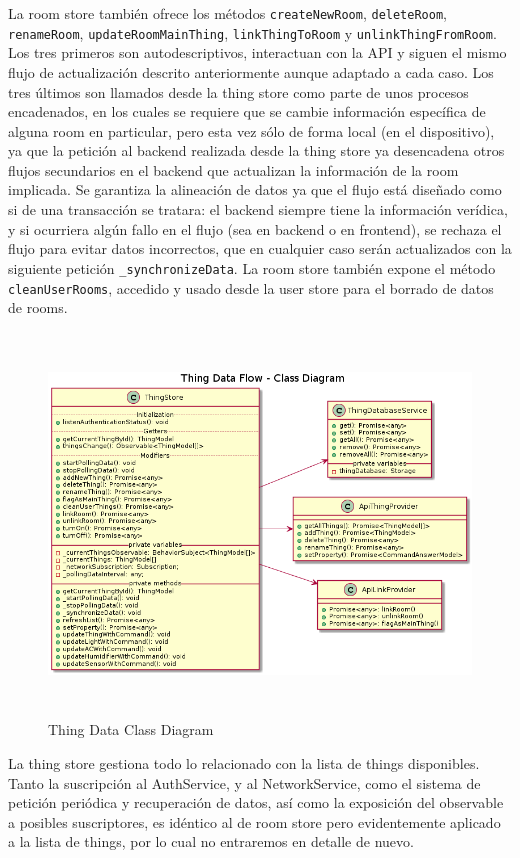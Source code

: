 La room store también ofrece los métodos \verb|createNewRoom|, \verb|deleteRoom|, \verb|renameRoom|, \verb|updateRoomMainThing|, \verb|linkThingToRoom| y \verb|unlinkThingFromRoom|. Los tres primeros son autodescriptivos, interactuan con la API y siguen el mismo flujo de actualización descrito anteriormente aunque adaptado a cada caso. Los tres últimos son llamados desde la thing store como parte de unos procesos encadenados, en los cuales se requiere que se cambie información específica de alguna room en particular, pero esta vez sólo de forma local (en el dispositivo), ya que la petición al backend realizada desde la thing store ya desencadena otros flujos secundarios en el backend que actualizan la información de la room implicada. Se garantiza la alineación de datos ya que el flujo está diseñado como si de una transacción se tratara: el backend siempre tiene la información verídica, y si ocurriera algún fallo en el flujo (sea en backend o en frontend), se rechaza el flujo para evitar datos incorrectos, que en cualquier caso serán actualizados con la siguiente petición \verb|_synchronizeData|. 
La room store también expone el método \verb|cleanUserRooms|, accedido y usado desde la user store para el borrado de datos de rooms.

\begin{figure}[hbt!]
\centering
\includegraphics[height=4in]{figures/diagrams/front/data-flow/thing.png}
\caption[thing]{Thing Data Class Diagram\footnotemark}
\end{figure}

La thing store gestiona todo lo relacionado con la lista de things disponibles. Tanto la suscripción al AuthService, y al NetworkService, como el sistema de petición periódica y recuperación de datos, así como la exposición del observable a posibles suscriptores, es idéntico al de room store pero evidentemente aplicado a la lista de things, por lo cual no entraremos en detalle de nuevo.

